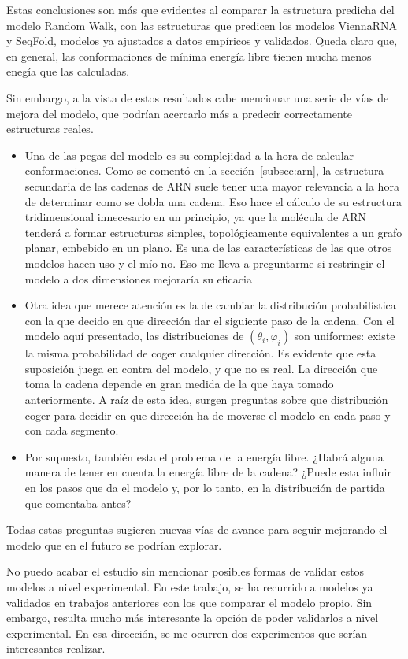 \documentclass[a4paper,11pt,titlepage]{article}
\newcommand{\nr}[2][sección]{\hyperref[#2]{#1~\ref{#2}}}
\renewcommand{\phi}{\varphi}
\theoremstyle{definition}
\begin{document}
Estas conclusiones son más que evidentes al comparar la estructura predicha del modelo Random Walk, con las estructuras que predicen los modelos ViennaRNA y SeqFold, modelos ya ajustados a datos empíricos y validados. Queda claro que, en general, las conformaciones de mínima energía libre tienen mucha menos enegía que las calculadas. 

Sin embargo, a la vista de estos resultados cabe mencionar una serie de vías de mejora del modelo, que podrían acercarlo más a predecir correctamente estructuras reales.

\begin{itemize}
    \item Una de las pegas del modelo es su complejidad a la hora de calcular conformaciones. Como se comentó en la \nr[sección]{subsec:arn}, la estructura secundaria de las cadenas de ARN suele tener una mayor relevancia a la hora de determinar como se dobla una cadena. Eso hace el cálculo de su estructura tridimensional innecesario en un principio, ya que la molécula de ARN tenderá a formar estructuras simples, topológicamente equivalentes a un grafo planar, embebido en un plano. Es una de las características de las que otros modelos hacen uso y el mío no. Eso me lleva a preguntarme si restringir el modelo a dos dimensiones mejoraría su eficacia
    \item Otra idea que merece atención es la de cambiar la distribución probabilística con la que decido en que dirección dar el siguiente paso de la cadena. Con el modelo aquí presentado, las distribuciones de $(\theta_i, \phi_i)$ son uniformes: existe la misma probabilidad de coger cualquier dirección. Es evidente que esta suposición juega en contra del modelo, y que no es real. La dirección que toma la cadena depende en gran medida de la que haya tomado anteriormente. A raíz de esta idea, surgen preguntas sobre que distribución coger para decidir en que dirección ha de moverse el modelo en cada paso y con cada segmento.
    \item Por supuesto, también esta el problema de la energía libre. ¿Habrá alguna manera de tener en cuenta la energía libre de la cadena? ¿Puede esta influir en los pasos que da el modelo y, por lo tanto, en la distribución de partida que comentaba antes?
\end{itemize}

Todas estas preguntas sugieren nuevas vías de avance para seguir mejorando el modelo que en el futuro se podrían explorar.

No puedo acabar el estudio sin mencionar posibles formas de validar estos modelos a nivel experimental. En este trabajo, se ha recurrido a modelos ya validados en trabajos anteriores con los que comparar el modelo propio. Sin embargo, resulta mucho más interesante la opción de poder validarlos a nivel experimental. En esa dirección, se me ocurren dos experimentos que serían interesantes realizar.
\end{document}
